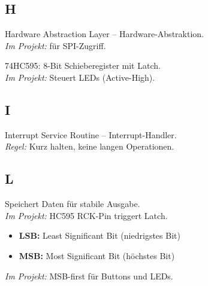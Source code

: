 \subsection*{H}

\begin{description}[style=nextline, leftmargin=2.5cm, labelwidth=2.3cm]

\item[HAL]
Hardware Abstraction Layer – Hardware-Abstraktion.\\
\textit{Im Projekt:}  für SPI-Zugriff.

\item[HC595]
74HC595: 8-Bit Schieberegister mit Latch.\\
\textit{Im Projekt:} Steuert LEDs (Active-High).

\end{description}

\subsection*{I}

\begin{description}[style=nextline, leftmargin=2.5cm, labelwidth=2.3cm]

\item[ISR]
Interrupt Service Routine – Interrupt-Handler.\\
\textit{Regel:} Kurz halten, keine langen Operationen.

\end{description}

\subsection*{L}

\begin{description}[style=nextline, leftmargin=2.5cm, labelwidth=2.3cm]

\item[Latch]
Speichert Daten für stabile Ausgabe.\\
\textit{Im Projekt:} HC595 RCK-Pin triggert Latch.

\item[LSB / MSB]
\begin{itemize}[nosep, leftmargin=1.5em]
\item \textbf{LSB:} Least Significant Bit (niedrigstes Bit)
\item \textbf{MSB:} Most Significant Bit (höchstes Bit)
\end{itemize}
\textit{Im Projekt:} MSB-first für Buttons und LEDs.

\end{description}

